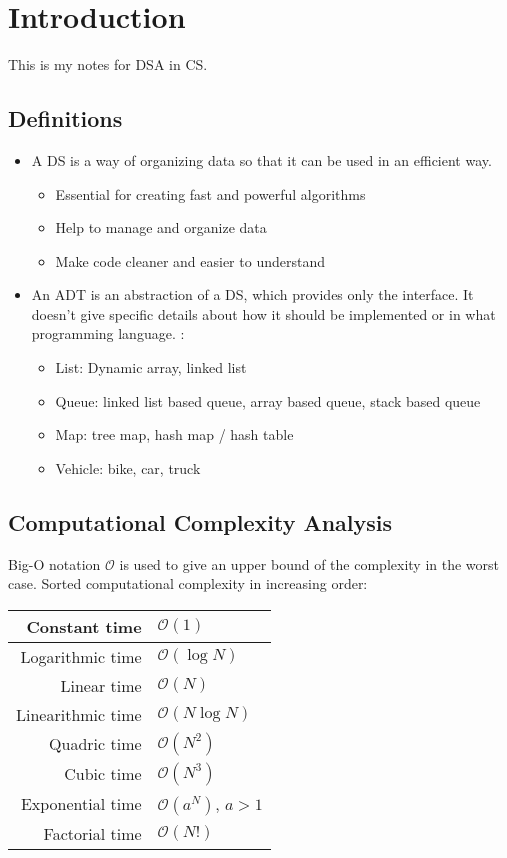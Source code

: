 \chapter{Introduction}

This is my notes for \ac{DSA} in \ac{CS}.

\section{Definitions}

\begin{itemize}
	\item A \ac{DS} is a way of organizing data so that it can be used in an efficient way.
	\begin{itemize}
		\item Essential for creating fast and powerful algorithms
		\item Help to manage and organize data
		\item Make code cleaner and easier to understand
	\end{itemize}
	\item An \ac{ADT} is an abstraction of a \ac{DS}, which provides only the interface. It doesn't give specific details about how it should be implemented or in what programming language. \Eg:
	\begin{itemize}
		\item List: Dynamic array, linked list
		\item Queue: linked list based queue, array based queue, stack based queue
		\item Map: tree map, hash map / hash table
		\item Vehicle: bike, car, truck
	\end{itemize}
\end{itemize}

\section{Computational Complexity Analysis}
Big-O notation $\mathcal{O}$ is used to give an upper bound of the complexity in the worst case. Sorted computational complexity in increasing order:

\begin{center}
	\begin{tabular}{|r|l|}
		\hline
		Constant time & $\mathcal{O}(1)$ \\ \hline
		Logarithmic time & $\mathcal{O}(\log N)$ \\ \hline
		Linear time & $\mathcal{O}(N)$ \\ \hline
		Linearithmic time & $\mathcal{O}(N \log N)$ \\ \hline
		Quadric time & $\mathcal{O}(N^2)$ \\ \hline
		Cubic time & $\mathcal{O}(N^3)$ \\ \hline
		Exponential time & $\mathcal{O}(a^N)$, $ a>1 $ \\ \hline
		Factorial time & $\mathcal{O}(N!)$ \\ \hline
	\end{tabular}
\end{center}

